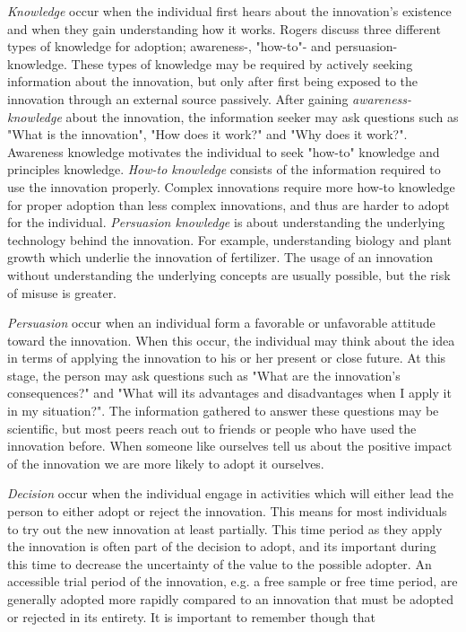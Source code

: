 \textit{Knowledge} occur when the individual first hears about the innovation's existence and when they gain understanding how it works. Rogers discuss three different types of knowledge for adoption; awareness-, "how-to"- and persuasion- knowledge. These types of knowledge may be required by actively seeking information about the innovation, but only after first being exposed to the innovation through an external source passively. After gaining \textit{awareness-knowledge} about the innovation, the information seeker may ask questions such as "What is the innovation", "How does it work?" and "Why does it work?". Awareness knowledge motivates the individual to seek "how-to" knowledge and principles knowledge. \textit{How-to knowledge} consists of the information required to use the innovation properly. Complex innovations require more how-to knowledge for proper adoption than less complex innovations, and thus are harder to adopt for the individual. \textit{Persuasion knowledge} is about understanding the underlying technology behind the innovation. For example, understanding biology and plant growth which underlie the innovation of fertilizer. The usage of an innovation without understanding the underlying concepts are usually possible, but the risk of misuse is greater.

\textit{Persuasion} occur when an individual form a favorable or unfavorable attitude toward the innovation. When this occur, the individual may think about the idea in terms of applying the innovation to his or her present or close future. At this stage, the person may ask questions such as "What are the innovation's consequences?" and "What will its advantages and disadvantages when I apply it in my situation?". The information gathered to answer these questions may be scientific, but most peers reach out to friends or people who have used the innovation before. When someone like ourselves tell us about the positive impact of the innovation we are more likely to adopt it ourselves.

\textit{Decision} occur when the individual engage in activities which will either lead the person to either adopt or reject the innovation. This means for most individuals to try out the new innovation at least partially. This time period as they apply the innovation is often part of the decision to adopt, and its important during this time to decrease the uncertainty of the value to the possible adopter. An accessible trial period of the innovation, e.g. a free sample or free time period, are generally adopted more rapidly compared to an innovation that must be adopted or rejected in its entirety. It is important to remember though that

